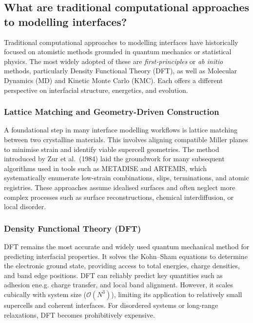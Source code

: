 \subsection{What are traditional computational approaches to modelling interfaces?}

Traditional computational approaches to modelling interfaces have historically focused on atomistic methods grounded in quantum mechanics or statistical physics. The most widely adopted of these are \textit{first-principles} or \textit{ab initio} methods, particularly Density Functional Theory (DFT), as well as Molecular Dynamics (MD) and Kinetic Monte Carlo (KMC). Each offers a different perspective on interfacial structure, energetics, and evolution.

\subsubsection{Lattice Matching and Geometry-Driven Construction}

A foundational step in many interface modelling workflows is lattice matching between two crystalline materials. This involves aligning compatible Miller planes to minimise strain and identify viable supercell geometries. The method introduced by Zur et al.~(1984) laid the groundwork for many subsequent algorithms used in tools such as \textsc{METADISE} and \textsc{ARTEMIS}, which systematically enumerate low-strain combinations, slips, terminations, and atomic registries. These approaches assume idealised surfaces and often neglect more complex processes such as surface reconstructions, chemical interdiffusion, or local disorder.

\subsubsection{Density Functional Theory (DFT)}

DFT remains the most accurate and widely used quantum mechanical method for predicting interfacial properties. It solves the Kohn--Sham equations to determine the electronic ground state, providing access to total energies, charge densities, and band edge positions. DFT can reliably predict key quantities such as adhesion ene.g. charge transfer, and local band alignment. However, it scales cubically with system size ($\mathcal{O}(N^3)$), limiting its application to relatively small supercells and coherent interfaces. For disordered systems or long-range relaxations, DFT becomes prohibitively expensive.

